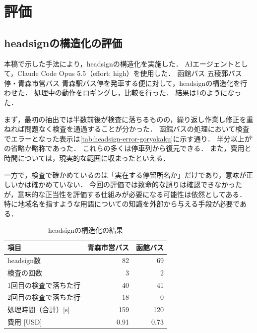 \section{評価}

\subsection{headsignの構造化の評価}

本稿で示した手法により，headsignの構造化を実施した．
AIエージェントとして，Claude Code Opus 5.5（effort: high）を使用した．
函館バス 五稜郭バス停・青森市営バス 青森駅バス停を発車する便に対して，headsignの構造化を行わせた．
処理中の動作をロギングし，比較を行った．
結果は\cref{tab:headsign-result}のようになった．

まず，最初の抽出では半数前後が検査に落ちるものの，繰り返し作業し修正を重ねれば問題なく検査を通過することが分かった．
函館バスの処理において検査でエラーとなった表示は\cref{tab:headsign-error-goryokaku}に示す通り．
半分以上が\~前の省略か略称であった．
これらの多くは停車列から復元できる．
また，費用と時間については，現実的な範囲に収まったといえる．

一方で，検査で確かめているのは「実在する停留所名か」だけであり，意味が正しいかは確かめていない．
今回の評価では致命的な誤りは確認できなかったが，意味的な正当性を評価する仕組みが必要になる可能性は依然としてある．
特に地域名を指すような用語についての知識を外部から与える手段が必要である．

\begin{table}[tb]
    \centering
    \caption{headsignの構造化の結果}
    \label{tab:headsign-result}
    \scriptsize
    \begin{tabular}{lrr}
        \toprule
        項目 & 青森市営バス & 函館バス \\
        \midrule
        headsign数 & 82 & 69 \\
        検査の回数 & 3 & 2 \\
        1回目の検査で落ちた行 & 40 & 41 \\
        2回目の検査で落ちた行 & 18 & 0 \\
        処理時間（合計）[s] & 159 & 120 \\
        費用 [USD] & 0.91 & 0.73 \\
        \bottomrule
    \end{tabular}
\end{table}

